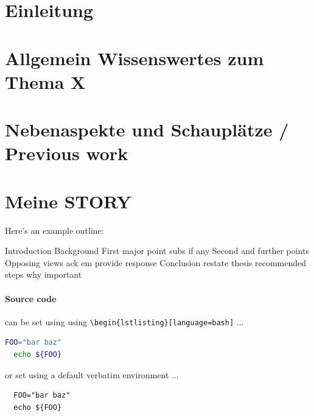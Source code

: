 


\maketitle %
\thispagestyle{empty}
\newpage
\tableofcontents
\thispagestyle{empty}
\newpage

\section{Einleitung}
\lipsum[1] %

\section{Allgemein Wissenswertes zum Thema X}
\lipsum[2-4] %

\section{Nebenaspekte und Schauplätze / Previous work}
\lipsum[5-6] %

\section{Meine STORY}
\lipsum[7-8] %
Here's an example outline:
\begin{outline}[enumerate]
  \1 Introduction
  \1 Background
  \1 First major point
    \2 subs if any
  \1 Second and further points
  \1 Opposing views
    \2 ack em
    \2 provide response
  \1 Conclusion
    \2 restate thesis
    \2 recommended steps
    \2 why important
\end{outline}
\lipsum[9-11] %
\paragraph{Source code} can be set using using \verb|\begin{lstlisting}[language=bash]| ...
  \begin{lstlisting}[language=bash]
  FOO="bar baz"
  echo ${FOO}
  \end{lstlisting}

  or set using a default verbatim environment ...
  \begin{verbatim}
  FOO="bar baz"
  echo ${FOO}
  \end{verbatim}


